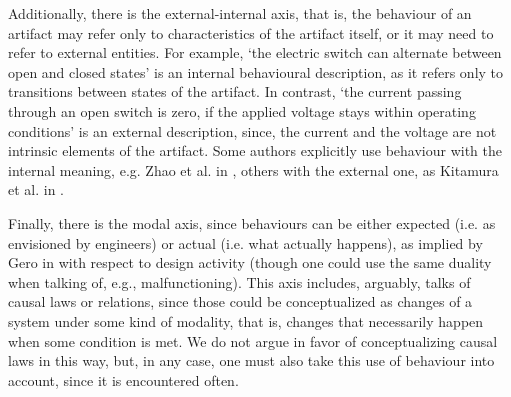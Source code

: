 \documentclass[sw]{iosart2x}
\newcommand{\TODO}[1]{{%
}}
\newcommand{\myComment}[1]{{\unskip \ignorespaces}}
\begin{document}
Additionally, there is the external-internal axis, that is, the behaviour of an artifact may refer only to characteristics of the artifact itself, or it may need to refer to \myComment{some} external entities.
For example, `the electric switch can alternate between open and closed states' is an internal behavioural description, as it refers only to transitions between states of the artifact.
In contrast, `the current passing through an open switch is zero, if the applied voltage stays within operating conditions' is an external description, since, the current and the voltage are not intrinsic elements of the artifact. %
Some authors explicitly use behaviour with the internal meaning, e.g. Zhao et al. in \cite{zhaoStateBehaviorFunction2019}, others with the external one, as Kitamura et al. in \cite{kitamuraOntologybasedSystematizationFunctional2004}.%

Finally, there is the modal axis, since \myComment{for \textcolor{blue}{(since? considering that?)}} behaviours can be \myComment{\textcolor{blue}{(either)}} either expected (i.e. as envisioned by engineers) or actual (i.e. what actually happens), as implied by Gero in \cite{geroSituatedFunctionBehaviour2004} with respect to design activity (though one could use the same duality when talking of, e.g., malfunctioning).
This axis includes, arguably, talks of causal laws or relations, since those could be conceptualized as changes of a system under some kind of %
modality, that is, changes that necessarily happen when some condition is met.
We do not argue in favor of conceptualizing causal laws in this way, but, in any case, one must also take this use of behaviour into account, since it is encountered often. %

\end{document}
